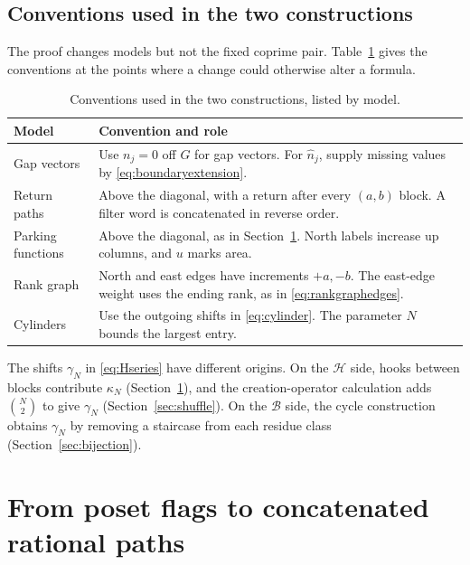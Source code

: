 \documentclass[12pt,reqno]{amsart}
\numberwithin{equation}{section}
\theoremstyle{definition}
\theoremstyle{remark}
\theoremstyle{plain}
\newcommand{\Hseries}{\mathscr H}
\newcommand{\Bseries}{\mathscr B}
\begin{document}
\subsection{Conventions used in the two constructions}
The proof changes models but not the fixed coprime pair. Table~\ref{tab:conventions} gives the conventions at the points where a change could otherwise alter a formula.
\par
\begin{table}[!htbp]
\centering
\renewcommand{\arraystretch}{1.25}
\begin{tabular}{|p{}|p{}|}
\hline
Model & Convention and role\\
\hline
Gap vectors & Use $n_j=0$ off $G$ for gap vectors. For $\widehat n_j$, supply missing values by \eqref{eq:boundaryextension}.\\
\hline
Return paths & Above the diagonal, with a return after every $(a,b)$ block. A filter word is concatenated in reverse order.\\
\hline
Parking functions & Above the diagonal, as in Section~\ref{sec:return}. North labels increase up columns, and $u$ marks area.\\
\hline
Rank graph & North and east edges have increments $+a,-b$.  The east-edge weight uses the ending rank, as in \eqref{eq:rankgraphedges}.\\
\hline
Cylinders & Use the outgoing shifts in \eqref{eq:cylinder}. The parameter $N$ bounds the largest entry.\\
\hline
\end{tabular}
\par\smallskip
\caption{Conventions used in the two constructions, listed by model.}
\label{tab:conventions}
\end{table}
\par


The shifts $\gamma_N$ in \eqref{eq:Hseries} have different origins. On the $\Hseries$ side, hooks between
blocks contribute $\kappa_N$ (Section~\ref{sec:return}), and the creation-operator calculation adds $\binom N2$ to give $\gamma_N$ (Section~\ref{sec:shuffle}).  On the $\Bseries$ side, the cycle construction obtains
$\gamma_N$ by removing a staircase from each residue class (Section~\ref{sec:bijection}).




\section{From poset flags to concatenated rational paths}\label{sec:return}
\end{document}
